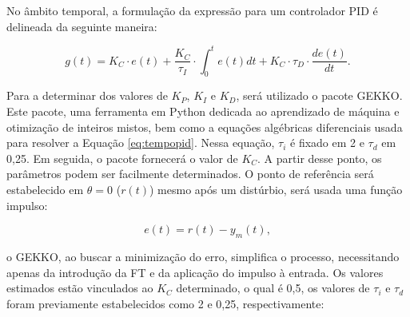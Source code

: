 \documentclass[12pt,           %
a4paper,                       %
openany,                       %
oneside,                       %
chapter=TITLE,                 %
english,                       %
spanish,                       %
brazil,                        %
sumario=tradicional]{abntex2}  %
\begin{document}
\begin{OnehalfSpace}
\begin{figure}[H]
\end{figure}
\vspace*{-.7cm}
{\raggedright {}}

No âmbito temporal, a formulação da expressão para um controlador PID é delineada da seguinte maneira:

\begin{equation}
     g(t) = K_C \cdot e(t) + \frac{K_C}{\tau_I}\cdot \int_0^t e(t) dt + K_C\cdot \tau_D \cdot \frac{de(t)}{dt}.
    \label{eq:tempopid}
\end{equation}

Para a determinar dos valores de $K_P$, $K_I$ e $K_D$, será utilizado o pacote GEKKO\cite{gekko}. Este pacote, uma ferramenta em Python dedicada ao aprendizado de máquina e otimização de inteiros mistos, bem como a equações algébricas diferenciais usada para resolver a Equação \ref{eq:tempopid}. Nessa equação, $\tau_i$ é fixado em 2 e $\tau_d$ em 0,25. Em seguida, o pacote fornecerá o valor de $K_C$. A partir desse ponto, os parâmetros podem ser facilmente determinados. O ponto de referência será estabelecido em $\theta=0$ ($r(t)$) mesmo após um distúrbio, será usada uma função impulso:

\begin{equation}
     e(t) = r(t) - y_m(t),
    \label{eq:erro}
\end{equation}

\noindent o GEKKO, ao buscar a minimização do erro, simplifica o processo, necessitando apenas da introdução da FT e da aplicação do impulso à entrada. Os valores estimados estão vinculados ao $K_C$ determinado, o qual é 0,5, os valores de $\tau_i$ e $\tau_d$ foram previamente estabelecidos como 2 e 0,25, respectivamente:



\end{OnehalfSpace}
\end{document}

